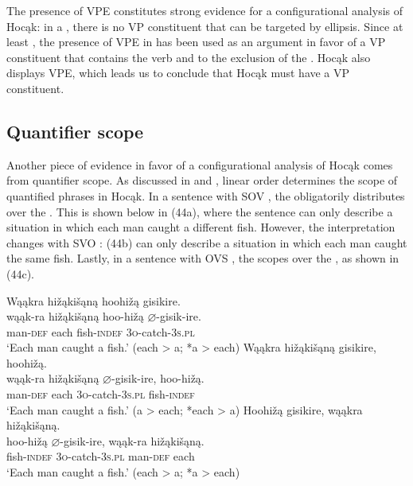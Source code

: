 \documentclass[output=paper]{LSP/langsci}
\begin{document}
 
The presence of VPE constitutes strong evidence for a configurational analysis of Hocąk: in a , there is no VP constituent that can be targeted by ellipsis. Since at least \citet{Ross1969}, the presence of VPE in  has been used as an argument in favor of a VP constituent that contains the verb and  to the exclusion of the . Hocąk also displays VPE, which leads us to conclude that Hocąk must have a VP constituent.
 

\subsection{Quantifier scope}

 
Another piece of evidence in favor of a configurational analysis of Hocąk comes from quantifier scope. As discussed in \citet{Johnson2014} and \citet{JohnsonRosen2014}, linear order determines the scope of quantified phrases in Hocąk. In a sentence with SOV , the  obligatorily distributes over the . This is shown below in (44a), where the sentence can only describe a situation in which each man caught a different fish. However, the interpretation changes with SVO : (44b) can only describe a situation in which each man caught the same fish. Lastly, in a sentence with OVS , the  scopes over the , as shown in (44c).
 

\begin{exe}
\ex\label{ex:jrs:44}
\begin{xlist}
\ex 
\glll Wąąkra	hi\v{z}ąki\v{s}ąną		hoohi\v{z}ą	gisikire.\\
wąąk-ra		hi\v{z}ąki\v{s}ąną		hoo-hi\v{z}ą	$\varnothing$-gisik-ire. \\
		man-\textsc{def}		each					fish-\textsc{indef}		\textsc{3o}-catch-\textsc{3s.pl} \\
\trans `Each man caught a fish.' (each > a; *a > each)
\ex 
\glll Wąąkra		hi\v{z}ąki\v{s}ąną		gisikire,			hoohi\v{z}ą.\\
wąąk-ra		hi\v{z}ąki\v{s}ąną		$\varnothing$-gisik-ire,	hoo-hi\v{z}ą. \\
		man-\textsc{def}		each					\textsc{3o}-catch-\textsc{3s.pl}		fish-\textsc{indef} \\
\trans `Each man caught a fish.'  (a > each; *each > a)
\ex 
\glll Hoohi\v{z}ą	gisikire,	wąąkra	 hi\v{z}ąki\v{s}ąną.\\
hoo-hi\v{z}ą	$\varnothing$-gisik-ire,		wąąk-ra	hi\v{z}ąki\v{s}ąną. \\
		fish-\textsc{indef}		\textsc{3o}-catch-\textsc{3s.pl}		man-\textsc{def}		each \\
\trans `Each man caught a fish.' (each > a; *a > each)
\end{xlist}
\end{exe}
\end{document}
